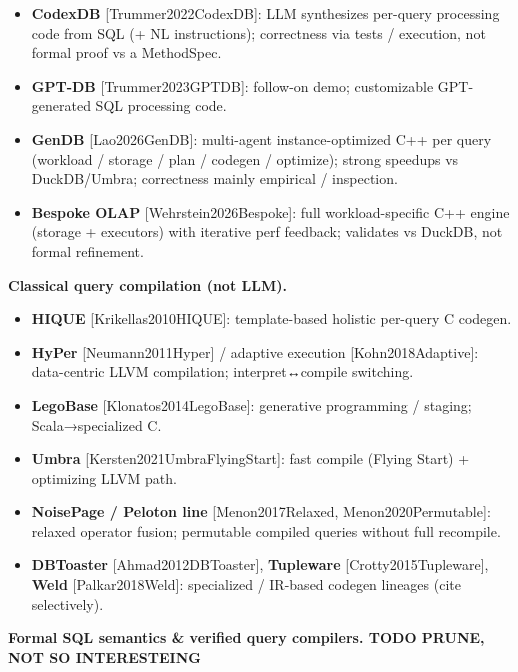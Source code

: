 \documentclass[
]{article}
\providecommand{\tightlist}{%
  \setlength{\itemsep}{0pt}\setlength{\parskip}{0pt}}
\begin{document}
\begin{itemize}
\tightlist
\item
  \textbf{CodexDB} {[}Trummer2022CodexDB{]}: LLM synthesizes per-query
  processing code from SQL (+ NL instructions); correctness via tests /
  execution, not formal proof vs a MethodSpec.
\item
  \textbf{GPT-DB} {[}Trummer2023GPTDB{]}: follow-on demo; customizable
  GPT-generated SQL processing code.
\item
  \textbf{GenDB} {[}Lao2026GenDB{]}: multi-agent instance-optimized C++
  per query (workload / storage / plan / codegen / optimize); strong
  speedups vs DuckDB/Umbra; correctness mainly empirical / inspection.
\item
  \textbf{Bespoke OLAP} {[}Wehrstein2026Bespoke{]}: full
  workload-specific C++ engine (storage + executors) with iterative perf
  feedback; validates vs DuckDB, not formal refinement.
\end{itemize}

\textbf{Classical query compilation (not LLM).}

\begin{itemize}
\tightlist
\item
  \textbf{HIQUE} {[}Krikellas2010HIQUE{]}: template-based holistic
  per-query C codegen.
\item
  \textbf{HyPer} {[}Neumann2011Hyper{]} / adaptive execution
  {[}Kohn2018Adaptive{]}: data-centric LLVM compilation;
  interpret↔compile switching.
\item
  \textbf{LegoBase} {[}Klonatos2014LegoBase{]}: generative programming /
  staging; Scala→specialized C.
\item
  \textbf{Umbra} {[}Kersten2021UmbraFlyingStart{]}: fast compile (Flying
  Start) + optimizing LLVM path.
\item
  \textbf{NoisePage / Peloton line} {[}Menon2017Relaxed,
  Menon2020Permutable{]}: relaxed operator fusion; permutable compiled
  queries without full recompile.
\item
  \textbf{DBToaster} {[}Ahmad2012DBToaster{]}, \textbf{Tupleware}
  {[}Crotty2015Tupleware{]}, \textbf{Weld} {[}Palkar2018Weld{]}:
  specialized / IR-based codegen lineages (cite selectively).
\end{itemize}

\textbf{Formal SQL semantics \& verified query compilers. TODO PRUNE,
NOT SO INTERESTEING}
\end{document}
